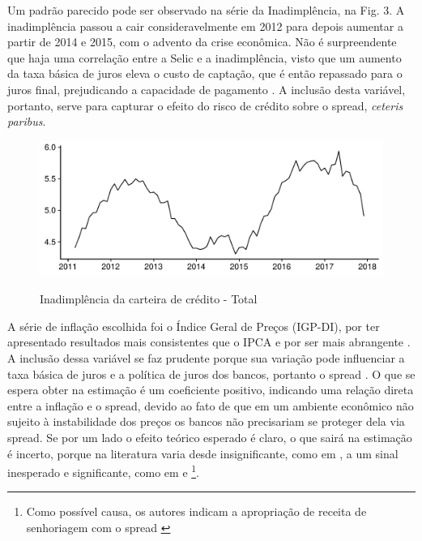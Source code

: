 \documentclass[a4paper, article, 12pt, openany, oneside, english, brazil]{abntex2}
\numberwithin{equation}{section}
\begin{document}
    Um padrão parecido pode ser observado na série da Inadimplência, na Fig. 3. A inadimplência passou a cair consideravelmente em 2012 para depois aumentar a partir de 2014 e 2015, com o advento da crise econômica. Não é surpreendente que haja uma correlação entre a Selic e a inadimplência, visto que um aumento da taxa básica de juros eleva o custo de captação, que é então repassado para o juros final, prejudicando a capacidade de pagamento \cite[p.~390]{oliveira2007}. A inclusão desta variável, portanto, serve para capturar o efeito do risco de crédito sobre o spread, \textit{ceteris paribus}.

\begin{figure}[t]
  \centering
    \caption{Inadimplência da carteira de crédito - Total}
      \includegraphics[width = \textwidth, scale=0.75]{Inadimplencia.pdf}
      \label{inad}
\end{figure}
    
    A série de inflação escolhida foi o Índice Geral de Preços (IGP-DI), por ter apresentado resultados mais consistentes que o IPCA \cite[p.~66]{rocha09} e por ser mais abrangente \cite[p.~21]{afanasieff02}. A inclusão dessa variável se faz prudente porque sua variação pode influenciar a taxa básica de juros e a política de juros dos bancos, portanto o spread \cite[p.~14]{bignotto06}. O que se espera obter na estimação é um coeficiente positivo, indicando uma relação direta entre a inflação e o spread, devido ao fato de que em um ambiente econômico não sujeito à instabilidade dos preços os bancos não precisariam se proteger dela via spread. Se por um lado o efeito teórico esperado é claro, o que sairá na estimação é incerto, porque na literatura varia desde insignificante, como em , a um sinal inesperado e significante, como em  e \footnote{Como possível causa, os autores indicam a apropriação de receita de senhoriagem com o spread \cite[p.~25]{afanasieff02}}.
    
\end{document}
